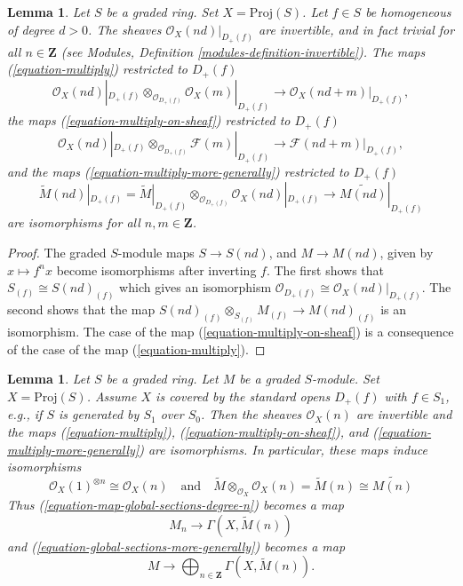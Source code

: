 \documentclass{stacks-project}
\theoremstyle{plain}
\newtheorem{lemma}[subsection]{Lemma}
\theoremstyle{definition}
\theoremstyle{remark}
\numberwithin{equation}{subsection}
\begin{document}
\begin{lemma}
\label{lemma-when-invertible}
Let $S$ be a graded ring. Set $X = \text{Proj}(S)$.
Let $f \in S$ be homogeneous of degree $d > 0$.
The sheaves $\mathcal{O}_X(nd)|_{D_{+}(f)}$ are invertible,
and in fact trivial for all $n \in \mathbf{Z}$
(see Modules, Definition \ref{modules-definition-invertible}).
The maps (\ref{equation-multiply}) restricted to $D_{+}(f)$
$$
\mathcal{O}_X(nd)|_{D_{+}(f)} \otimes_{\mathcal{O}_{D_{+}(f)}}
\mathcal{O}_X(m)|_{D_{+}(f)}
\longrightarrow
\mathcal{O}_X(nd + m)|_{D_{+}(f)},
$$
the maps (\ref{equation-multiply-on-sheaf}) restricted to $D_+(f)$
$$
\mathcal{O}_X(nd)|_{D_{+}(f)} \otimes_{\mathcal{O}_{D_{+}(f)}}
\mathcal{F}(m)|_{D_{+}(f)}
\longrightarrow
\mathcal{F}(nd + m)|_{D_{+}(f)},
$$
and the maps (\ref{equation-multiply-more-generally})
restricted to $D_{+}(f)$
$$
\widetilde M(nd)|_{D_{+}(f)}
=
\widetilde M|_{D_{+}(f)}
\otimes_{\mathcal{O}_{D_{+}(f)}}
\mathcal{O}_X(nd)|_{D_{+}(f)}
\longrightarrow
\widetilde{M(nd)}|_{D_{+}(f)}
$$
are isomorphisms for all $n, m \in \mathbf{Z}$.
\end{lemma}

\begin{proof}
The graded $S$-module maps $S \to S(nd)$, and $M \to M(nd)$, given by
$x \mapsto f^n x$ become isomorphisms after inverting $f$. The first shows that
$S_{(f)} \cong S(nd)_{(f)}$ which gives an isomorphism
$\mathcal{O}_{D_{+}(f)} \cong \mathcal{O}_X(nd)|_{D_{+}(f)}$.
The second shows that the map
$S(nd)_{(f)} \otimes_{S_{(f)}} M_{(f)} \to M(nd)_{(f)}$
is an isomorphism. The case of the map (\ref{equation-multiply-on-sheaf})
is a consequence of the case of the map (\ref{equation-multiply}).
\end{proof}

\begin{lemma}
\label{lemma-apply-modules}
Let $S$ be a graded ring. Let $M$ be a graded $S$-module.
Set $X = \text{Proj}(S)$. Assume $X$ is covered by the standard
opens $D_+(f)$ with $f \in S_1$, e.g., if $S$ is generated by $S_1$
over $S_0$. Then the sheaves $\mathcal{O}_X(n)$
are invertible and the maps
(\ref{equation-multiply}), (\ref{equation-multiply-on-sheaf}), and
(\ref{equation-multiply-more-generally}) are isomorphisms.
In particular, these maps induce isomorphisms
$$
\mathcal{O}_X(1)^{\otimes n} \cong
\mathcal{O}_X(n)
\quad
\text{and}
\quad
\widetilde{M} \otimes_{\mathcal{O}_X} \mathcal{O}_X(n) =
\widetilde{M}(n) \cong \widetilde{M(n)}
$$
Thus (\ref{equation-map-global-sections-degree-n}) becomes a map
\begin{equation}
\label{equation-map-global-sections-degree-n-simplified}
M_n \longrightarrow \Gamma(X, \widetilde{M}(n))
\end{equation}
and (\ref{equation-global-sections-more-generally}) becomes a map
\begin{equation}
\label{equation-global-sections-more-generally-simplified}
M \longrightarrow
\bigoplus\nolimits_{n \in \mathbf{Z}} \Gamma(X, \widetilde{M}(n)).
\end{equation}
\end{lemma}
\end{document}

